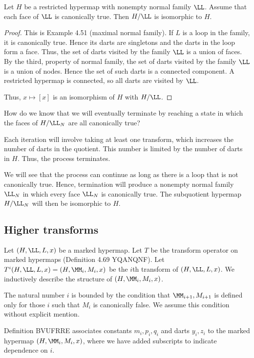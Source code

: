 \begin{lemma}
\begin{lemma}
\begin{lemma}
Let $H$ be a restricted hypermap with nonempty
normal family
$\LL$.  Assume that each face of $\LL$ is canonically true.  Then
$H/\LL$ is isomorphic to $H$.
\end{lemma} 

\begin{proof} This is Example 4.51 (maximal normal family).
If $L$ is a loop in the family, it is canonically true.  Hence its
darts are singletons and the darts in the loop form a face.  Thus,
the set of darts visited by the family $\LL$ is a union of faces.
By the third, property of normal family, the set of darts visited by
the family $\LL$ is a union of nodes.  Hence the set of such darts is
a connected component.  A restricted hypermap is connected,
so all darts are visited by $\LL$.  

Thus, $x \mapsto [x]$ is an isomorphism of $H$ with $H/\LL$.
\end{proof}


How do we know that we will eventually terminate by reaching
a state in which the faces of $H/\LL_N$ are all canonically true?

Each iteration will involve taking at least one transform, which
increases the number of darts in the quotient.  This number is
limited by the number of darts in $H$.  Thus, the process terminates.

We will see that the process can continue as long as there is a 
loop that is not canonically true.  Hence, termination will produce
a nonempty normal family $\LL_N$ in which every face $\LL_N$ is 
canonically true.  The subquotient hypermap $H/\LL_N$
will then be isomorphic to $H$.

\subsection{Higher transforms}


Let $(H,\LL,L,x)$ be a marked hypermap.  
Let $T$ be the transform operator on marked hypermaps
(Definition 4.69 YQANQNF).  
Let $T^i(H,\LL,L,x) = (H,\MM_i,M_i,x)$ be the $i$th transform of
$(H,\LL,L,x)$.  We inductively describe the structure of $(H,\MM_i,M_i,x)$.

The natural number $i$ is bounded by the condition that $\MM_{i+1},M_{i+1}$ is defined only for those $i$ such that $M_i$ is canonically false.
We assume this condition without explicit mention.

Definition BVUFRRE associates constants $m_i,p_i,q_i$ and darts $y_i,z_i$
to the marked hypermap $(H,\MM_i,M_i,x)$, where we have added
subscripts to indicate dependence on $i$.



\end{lemma}
\end{lemma}
